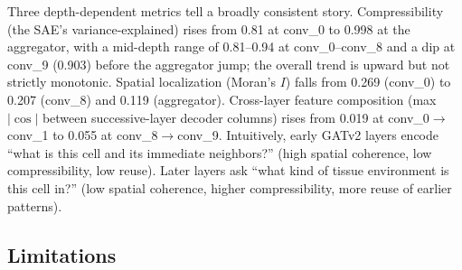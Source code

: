 \documentclass[11pt]{article}
\begin{document}
Three depth-dependent metrics tell a broadly consistent story.
Compressibility (the SAE's variance-explained) rises from 0.81 at
conv\_0 to 0.998 at the aggregator, with a mid-depth range of
0.81--0.94 at conv\_0--conv\_8 and a dip at conv\_9 (0.903) before the
aggregator jump; the overall trend is upward but not strictly
monotonic. Spatial localization (Moran's $I$) falls from 0.269
(conv\_0) to 0.207 (conv\_8) and 0.119 (aggregator). Cross-layer
feature composition (max $|\cos|$ between successive-layer decoder
columns) rises from 0.019 at conv\_0$\to$conv\_1 to 0.055 at
conv\_8$\to$conv\_9. Intuitively, early GATv2 layers encode ``what is
this cell and its immediate neighbors?'' (high spatial coherence, low
compressibility, low reuse). Later layers ask ``what kind of tissue
environment is this cell in?'' (low spatial coherence, higher
compressibility, more reuse of earlier patterns).

\subsection{Limitations}
\end{document}
